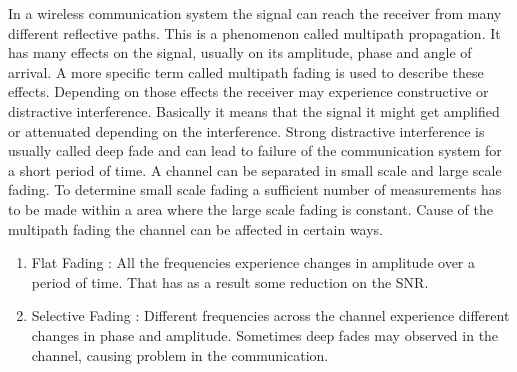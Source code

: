 In a wireless communication system the signal can reach the receiver from many different reflective paths. This is a phenomenon called multipath propagation. It has many effects on the signal, usually on its amplitude, phase and angle of arrival.\citep{Fading} A more specific term called multipath fading is used to describe these effects. Depending on those effects the receiver may experience constructive or distractive interference. Basically it means that the signal it might get amplified or attenuated depending on the interference. Strong distractive interference is usually called deep fade and can lead to failure of the communication system for a short period of time. A  channel can be separated in  small scale and large scale fading. To determine small scale fading a sufficient number of measurements has to be made within a area where the large scale fading is constant. Cause of the multipath fading the channel can be affected in certain ways.
	\begin{enumerate}
	\item Flat Fading : All the frequencies experience changes in amplitude over a period of time. That has as a result some reduction on the SNR.
	\item Selective Fading : Different frequencies across the channel experience different changes in phase and amplitude. Sometimes deep fades may observed in the channel, causing problem in the communication.\citep{FlatSelective}
	\end{enumerate}

